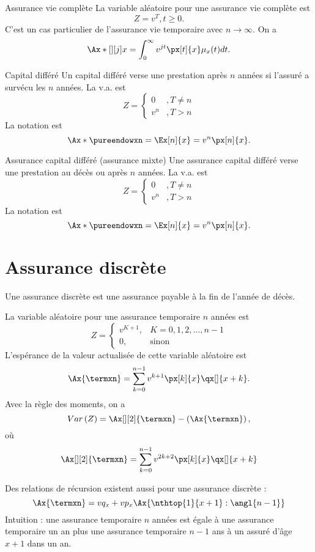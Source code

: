 \begin{definition}{Assurance vie complète}{}
	La variable aléatoire pour une assurance vie complète est $$Z=v^T, t\geq 0.$$ C'est un cas particulier de l'assurance vie temporaire avec $n\to \infty$. On a 
	$$\Ax*[][j]{x} =  \int_{0}^{\infty}v^{jt} \px[t]{x}\mu_x(t) dt.$$
\end{definition}

\begin{definition}{Capital différé}{}
	Un capital différé verse une prestation après $n$ années si l'assuré a survécu les $n$ années. La v.a. est
	$$Z = \begin{cases}
	0&, T\neq n\\
	v^n&, T > n
	\end{cases}$$	
	La notation est 
	$$\Ax*{\pureendowxn} = \Ex[n]{x}= v^n \px[n]{x}.$$
\end{definition}

\begin{definition}{Assurance capital différé (assurance mixte)}{}
	Une assurance capital différé verse une prestation au décès ou après $n$ années. La v.a. est
	$$Z = \begin{cases}
	0&, T\neq n\\
	v^n&, T > n
	\end{cases}$$	
	La notation est 
	$$\Ax*{\pureendowxn} = \Ex[n]{x}= v^n \px[n]{x}.$$
\end{definition}

\section{Assurance discrète}

Une assurance discrète est une assurance payable à la fin de l'année de décès. 
\begin{definition}{}{}
	La variable aléatoire pour une assurance temporaire $n$ années est 
	$$Z = \begin{cases}
	v^{K + 1}, & K = 0, 1, 2, \dots, n-1\\
	0, & \text{sinon}
	\end{cases}$$
	L'espérance de la valeur actualisée de cette variable aléatoire est 
	$$\Ax{\termxn} = \sum_{k = 0}^{n-1}v^{k + 1}\px[k]{x}\qx[]{x+k}.$$
	Avec la règle des moments, on a 
	$$Var\left(Z\right) = \Ax[][2]{\termxn} - \left(\Ax{\termxn}\right),$$
	où $$\Ax[][2]{\termxn} = \sum_{k = 0}^{n-1}v^{2k + 2}\px[k]{x}\qx[]{x+k}$$
\end{definition}

Des relations de récursion existent aussi pour une assurance discrète : 
$$\Ax{\termxn} = vq_x + vp_x \Ax{\nthtop{1}{x+1}:\angl{n-1}}$$
Intuition : une assurance temporaire $n$ années est égale à une assurance temporaire un an plus une assurance temporaire $n-1$ ans à un assuré d'âge $x+1$ dans un an.

